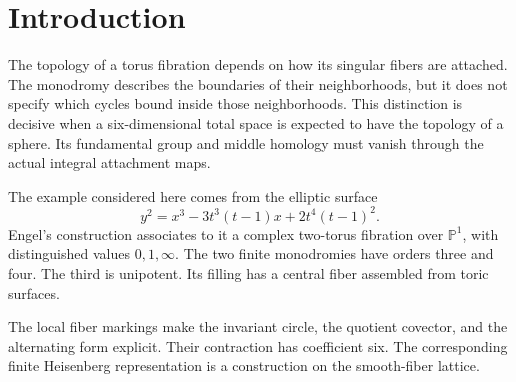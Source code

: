 \documentclass[11pt]{article}
\numberwithin{equation}{section}
\begin{document}
\begin{abstract}
The invariant integral fiber class has type $(1,1)$ and an ordinary
Dolbeault lift with curve periods $(-2,3,0)$.
Their nonnegative zero cone $(3s,2s,t)$, with $s,t\ge0$, gives
global nonzero positive exact currents and excludes pluriclosed Hermitian metrics.
The sum of the three curve classes is the nonzero second tangent
Bott--Chern class and gives
a nonzero bosonic chiral differential operator gerbe class in the published band.
The canonical line separately obstructs standard Virasoro gluing;
an exponential chart gives the quantum correction and inverse maps.

For the alternative holomorphic twist of the abelian six-dimensional
$(2,0)$ theory, invariant total forms give a finite-rank complex
and a strict unital $P_0$ comparison of the specified resolved
classical observables over the smooth base.
It retains the full period derivative, relative Serre trace and affine gluing.
Free root covers require degree-normalized brackets.
A constant family retains a central polynomial factor.
The classical comparison across the singular cusp and its
quantization require further constructions.
\end{abstract}

\clearpage
\tableofcontents
\clearpage

\section*{Introduction}

The topology of a torus fibration depends on how its singular fibers
are attached. The monodromy describes the boundaries of their
neighborhoods, but it does not specify which cycles bound inside
those neighborhoods. This distinction is decisive when a six-dimensional total space is
expected to have the topology of a sphere.
Its fundamental group and middle homology must vanish through the
actual integral attachment maps.

The example considered here comes from the elliptic surface
\[
 y^2=x^3-3t^3(t-1)x+2t^4(t-1)^2.
\]
Engel's construction associates to it a complex two-torus fibration
over $\mathbb P^1$, with distinguished values $0,1,\infty$.
The two finite monodromies have orders three and four. The third is
unipotent. Its filling has a central fiber assembled from toric surfaces.

The local fiber
markings make the invariant circle, the quotient covector, and the
alternating form explicit. Their contraction has coefficient six.
The corresponding finite Heisenberg representation is a construction
on the smooth-fiber lattice.
\end{document}
